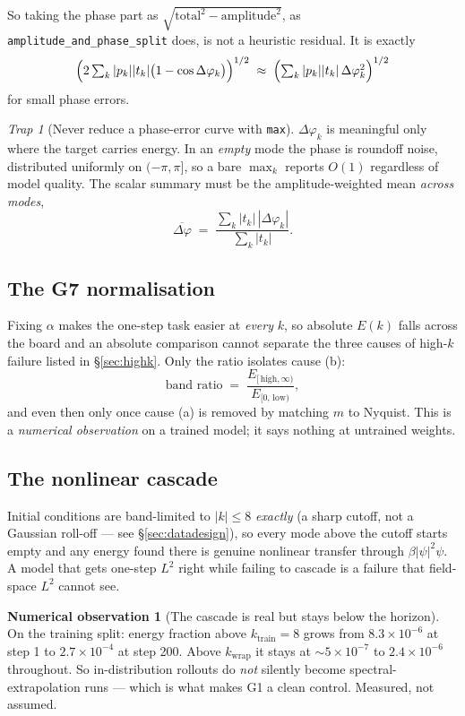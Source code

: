 \documentclass[11pt,a4paper]{article}
\theoremstyle{plain}
\theoremstyle{definition}
\newtheorem{observation}[theorem]{Numerical observation}
\theoremstyle{remark}
\newtheorem{trap}[theorem]{Trap}
\newcommand{\kwrap}{k_{\mathrm{wrap}}}
\newcommand{\ktrain}{k_{\mathrm{train}}}
\newcommand{\code}[1]{\texttt{\small #1}}
\begin{document}
So taking the phase part as $\sqrt{\text{total}^2-\text{amplitude}^2}$, as
\code{amplitude\_and\_phase\_split} does, is not a heuristic residual. It is exactly
\[
\Bigl(2\textstyle\sum_k|p_k||t_k|\bigl(1-\cos\Delta\varphi_k\bigr)\Bigr)^{1/2}
\;\approx\;
\Bigl(\textstyle\sum_k|p_k||t_k|\,\Delta\varphi_k^2\Bigr)^{1/2}
\]
for small phase errors.

\begin{trap}[Never reduce a phase-error curve with \texttt{max}]
\label{trap:phasemax}
$\Delta\varphi_k$ is meaningful only where the target carries energy. In an \emph{empty}
mode the phase is roundoff noise, distributed uniformly on $(-\pi,\pi]$, so a bare
$\max_k$ reports $O(1)$ regardless of model quality. The scalar summary must be the
amplitude-weighted mean \emph{across modes},
\[
\overline{\Delta\varphi} \;=\; \frac{\sum_k |t_k|\,|\Delta\varphi_k|}{\sum_k|t_k|}.
\]
\end{trap}

\subsection{The G7 normalisation}

Fixing $\alpha$ makes the one-step task easier at \emph{every} $k$, so absolute $E(k)$
falls across the board and an absolute comparison cannot separate the three causes of
high-$k$ failure listed in \S\ref{sec:highk}. Only the ratio isolates cause (b):
\[
\text{band ratio} \;=\; \frac{E_{[\,\text{high},\infty)}}{E_{[0,\,\text{low})}},
\]
and even then only once cause (a) is removed by matching $m$ to Nyquist. This is a
\emph{numerical observation} on a trained model; it says nothing at untrained weights.

\subsection{The nonlinear cascade}

Initial conditions are band-limited to $|k|\le 8$ \emph{exactly} (a sharp cutoff, not a
Gaussian roll-off --- see \S\ref{sec:datadesign}), so every mode above the cutoff starts
empty and any energy found there is genuine nonlinear transfer through $\beta|\psi|^2\psi$.
A model that gets one-step $L^2$ right while failing to cascade is a failure that
field-space $L^2$ cannot see.

\begin{observation}[The cascade is real but stays below the horizon]
\label{obs:cascade}
On the training split: energy fraction above $\ktrain=8$ grows from $8.3\times10^{-6}$ at
step 1 to $2.7\times10^{-4}$ at step 200. Above $\kwrap$ it stays at
$\sim5\times10^{-7}$ to $2.4\times10^{-6}$ throughout. So in-distribution rollouts do
\emph{not} silently become spectral-extrapolation runs --- which is what makes G1 a clean
control. Measured, not assumed.
\end{observation}
\end{document}
